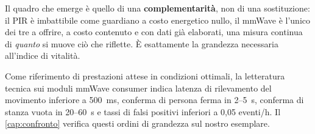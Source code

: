 Il quadro che emerge è quello di una \textbf{complementarità}, non di una
sostituzione: il PIR è imbattibile come guardiano a costo energetico nullo, il
mmWave è l'unico dei tre a offrire, a costo contenuto e con dati già elaborati,
una misura continua di \emph{quanto} si muove ciò che riflette. È esattamente la
grandezza necessaria all'indice di vitalità.

\medskip
\noindent
Come riferimento di prestazioni attese in condizioni ottimali, la letteratura
tecnica sui moduli mmWave consumer indica latenza di rilevamento del movimento
inferiore a 500~ms, conferma di persona ferma in 2--5~s, conferma di stanza vuota
in 20--60~s e tassi di falsi positivi inferiori a 0,05 eventi/h.
Il \cref{cap:confronto} verifica questi ordini di grandezza sul nostro esemplare.
